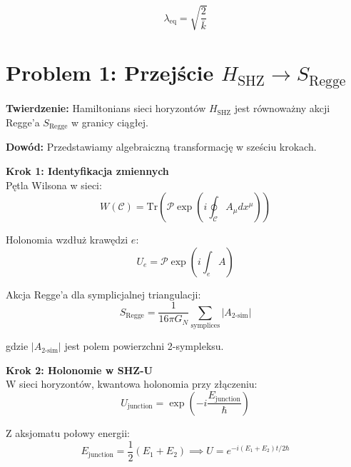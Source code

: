 \documentclass[11pt,a4paper]{article}
\begin{document}
\begin{equation}
\lambda_{\text{eq}} = \sqrt{\frac{2}{\bar{k}}}
\end{equation}

\bigskip

\section{Problem 1: Przejście $H_{\text{SHZ}} \to S_{\text{Regge}}$}

\bigskip

\textbf{Twierdzenie:} Hamiltonians sieci horyzontów $H_{\text{SHZ}}$ jest równoważny akcji Regge'a $S_{\text{Regge}}$ w granicy ciągłej.

\bigskip

\textbf{Dowód:} Przedstawiamy algebraiczną transformację w sześciu krokach.

\bigskip

\textbf{Krok 1: Identyfikacja zmiennych}\\

Pętla Wilsona w sieci:
\begin{equation}
W(\mathcal{C}) = \text{Tr} \left( \mathcal{P} \exp\left( i \oint_{\mathcal{C}} A_\mu dx^\mu \right) \right)
\end{equation}

Holonomia wzdłuż krawędzi $e$:
\begin{equation}
U_e = \mathcal{P} \exp\left( i \int_e A \right)
\end{equation}

Akcja Regge'a dla symplicjalnej triangulacji:
\begin{equation}
S_{\text{Regge}} = \frac{1}{16\pi G_N} \sum_{\text{symplices}} |A_{\text{2-sim}}|
\end{equation}

gdzie $|A_{\text{2-sim}}|$ jest polem powierzchni 2-sympleksu.

\bigskip

\textbf{Krok 2: Holonomie w SHZ-U}\\

W sieci horyzontów, kwantowa holonomia przy złączeniu:
\begin{equation}
U_{\text{junction}} = \exp\left( -i \frac{E_{\text{junction}}}{\hbar} \right)
\end{equation}

Z aksjomatu połowy energii:
\begin{equation}
E_{\text{junction}} = \frac{1}{2}(E_1 + E_2) \implies U = e^{-i(E_1 + E_2)t/2\hbar}
\end{equation}
\end{document}
